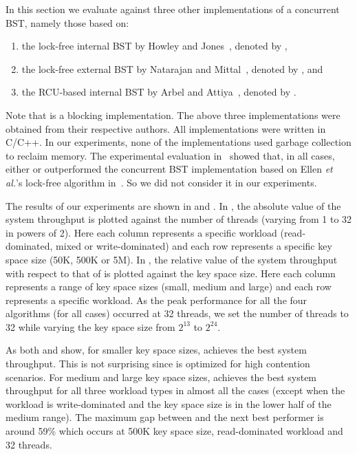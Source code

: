In this section we evaluate \CASTLE{} against three other implementations of a concurrent 
BST, namely those based on:
\begin{enumerate}[label=(\roman*)]
\item the lock-free internal BST by Howley and Jones~\cite{HowJon:2012:SPAA}, denoted by \HJBST{},
\item the lock-free external BST by Natarajan and Mittal~\cite{NatMit:2014:PPoPP}, denoted by \NMBST{}, and 
\item the RCU-based internal BST by Arbel and Attiya~\cite{ArbAtt:2014:PODC}, denoted by \CITRUS{}.
\end{enumerate}
Note that \CITRUS{} is a blocking implementation. The above three implementations were obtained from their respective authors. All implementations were written in C/C++. In our experiments, none of the implementations used garbage collection to reclaim memory. The experimental evaluation in~\cite{HowJon:2012:SPAA, NatMit:2014:PPoPP} showed that, in all cases,  either \HJBST{} or \NMBST{} outperformed the concurrent BST implementation based on Ellen \emph{et al.}'s lock-free algorithm in~\cite{EllFat+:2010:PODC}. So we did not consider it in our experiments. 



The results of our experiments are shown in   and . In , the absolute value of the system throughput is plotted against the number of threads (varying from 1 to 32 in powers of 2). Here each column represents a specific workload (read-dominated, mixed or write-dominated) and each row represents a specific key space size (50K, 500K or 5M). In , the relative value of the system throughput with respect to that of \HJBST{} is plotted against the key space size. Here each column represents a range of key space sizes (small, medium and large) and each row represents a specific workload. As the peak performance for all the four algorithms (for all cases) occurred at 32 threads, we set the number of threads to 32 while varying the key space size from $2^{13}$ to $2^{24}$.

As both  and  show, for smaller key space sizes, \NMBST{} achieves the best system throughput. This is not surprising since \NMBST{} is optimized for high contention scenarios. For medium and large key space sizes, \CASTLE{} achieves the best system throughput for all three workload types in almost all the cases (except when the workload is write-dominated and the key space size is in the lower half of the medium range). The maximum gap between \CASTLE{} and the next best performer is around 59\% which occurs at 500K key space size, read-dominated workload and 32 threads.

